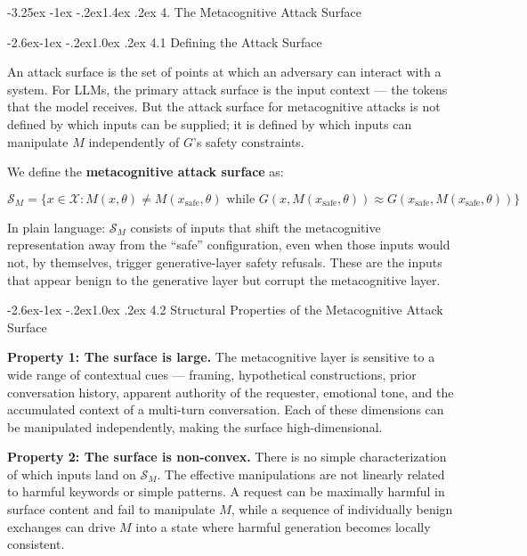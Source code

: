 \documentclass[
  11pt,
]{article}
\makeatletter
\renewcommand\section{\@startsection{section}{1}{\z@}%
  {-3.25ex \@plus -1ex \@minus -.2ex}{1.4ex \@plus.2ex}%
  {\normalfont\sffamily\Large\bfseries}}
\renewcommand\subsection{\@startsection{subsection}{2}{\z@}%
  {-2.6ex\@plus -1ex \@minus -.2ex}{1.0ex \@plus .2ex}%
  {\normalfont\sffamily\large\bfseries}}
\makeatother
\begin{document}
\section{4. The Metacognitive Attack
Surface}\label{the-metacognitive-attack-surface}

\subsection{4.1 Defining the Attack
Surface}\label{defining-the-attack-surface}

An attack surface is the set of points at which an adversary can
interact with a system. For LLMs, the primary attack surface is the
input context --- the tokens that the model receives. But the attack
surface for metacognitive attacks is not defined by which inputs can be
supplied; it is defined by which inputs can manipulate \(M\)
independently of \(G\)'s safety constraints.

We define the \textbf{metacognitive attack surface} as:

\[\mathcal{S}_M = \{x \in \mathcal{X} : M(x, \theta) \neq M(x_{\text{safe}}, \theta) \text{ while } G(x, M(x_{\text{safe}}, \theta)) \approx G(x_{\text{safe}}, M(x_{\text{safe}}, \theta))\}\]

In plain language: \(\mathcal{S}_M\) consists of inputs that shift the
metacognitive representation away from the ``safe'' configuration, even
when those inputs would not, by themselves, trigger generative-layer
safety refusals. These are the inputs that appear benign to the
generative layer but corrupt the metacognitive layer.

\subsection{4.2 Structural Properties of the Metacognitive Attack
Surface}\label{structural-properties-of-the-metacognitive-attack-surface}

\textbf{Property 1: The surface is large.} The metacognitive layer is
sensitive to a wide range of contextual cues --- framing, hypothetical
constructions, prior conversation history, apparent authority of the
requester, emotional tone, and the accumulated context of a multi-turn
conversation. Each of these dimensions can be manipulated independently,
making the surface high-dimensional.

\textbf{Property 2: The surface is non-convex.} There is no simple
characterization of which inputs land on \(\mathcal{S}_M\). The
effective manipulations are not linearly related to harmful keywords or
simple patterns. A request can be maximally harmful in surface content
and fail to manipulate \(M\), while a sequence of individually benign
exchanges can drive \(M\) into a state where harmful generation becomes
locally consistent.
\end{document}
